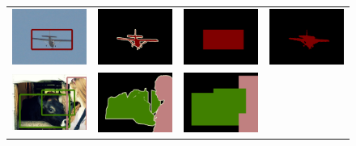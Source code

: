 \begin{figure}
  \centering
  \begin{tabular}{c c c c}
    \includegraphics[width=0.21\linewidth]{fig/erode_bbox/img/2010_004063.jpg} & 
    \includegraphics[width=0.21\linewidth]{fig/erode_bbox/gt/2010_004063.png} & 
    \includegraphics[width=0.21\linewidth]{fig/erode_bbox/bbox/2010_004063.png} & 
    \includegraphics[width=0.21\linewidth]{fig/erode_bbox/crf/2010_004063.png} \\    
    \includegraphics[width=0.21\linewidth]{fig/erode_bbox/img/2009_000219.jpg} & 
    \includegraphics[width=0.21\linewidth]{fig/erode_bbox/gt/2009_000219.png} & 
    \includegraphics[width=0.21\linewidth]{fig/erode_bbox/bbox/2009_000219.png} & 

\end{tabular}
\end{figure}

